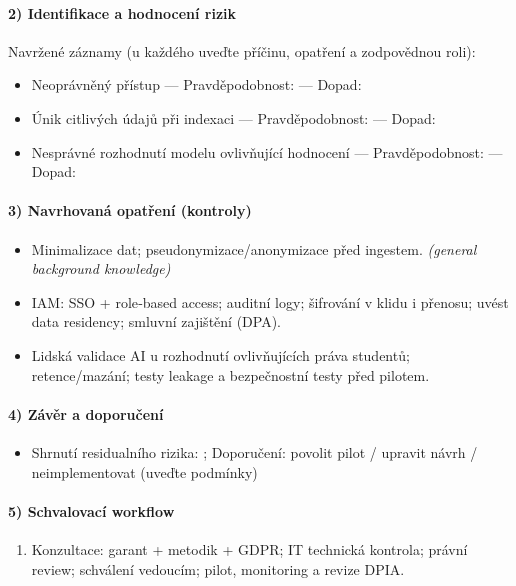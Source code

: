\documentclass{report}%
\begin{document}
\paragraph{2) Identifikace a hodnocení rizik}
Navržené záznamy (u každého uveďte příčinu, opatření a zodpovědnou roli):
\begin{itemize}
\item Neoprávněný přístup — Pravděpodobnost: \underline{\hspace{2cm}} — Dopad: \underline{\hspace{2cm}}
\item Únik citlivých údajů při indexaci — Pravděpodobnost: \underline{\hspace{2cm}} — Dopad: \underline{\hspace{2cm}}
\item Nesprávné rozhodnutí modelu ovlivňující hodnocení — Pravděpodobnost: \underline{\hspace{2cm}} — Dopad: \underline{\hspace{2cm}}
\end{itemize}
\paragraph{3) Navrhovaná opatření (kontroly)}\begin{itemize}
\item Minimalizace dat; pseudonymizace/anonymizace před ingestem. \textit{(general background knowledge)}
\item IAM: SSO + role‑based access; auditní logy; šifrování v klidu i přenosu; uvést data residency; smluvní zajištění (DPA).
\item Lidská validace AI u rozhodnutí ovlivňujících práva studentů; retence/mazání; testy leakage a bezpečnostní testy před pilotem.
\end{itemize}
\paragraph{4) Závěr a doporučení}\begin{itemize}
\item Shrnutí residualního rizika: \underline{\hspace{6cm}}; Doporučení: povolit pilot / upravit návrh / neimplementovat (uveďte podmínky)
\end{itemize}
\paragraph{5) Schvalovací workflow}\begin{enumerate}
\item Konzultace: garant + metodik + GDPR; IT technická kontrola; právní review; schválení vedoucím; pilot, monitoring a revize DPIA.
\end{enumerate}
\end{document}
